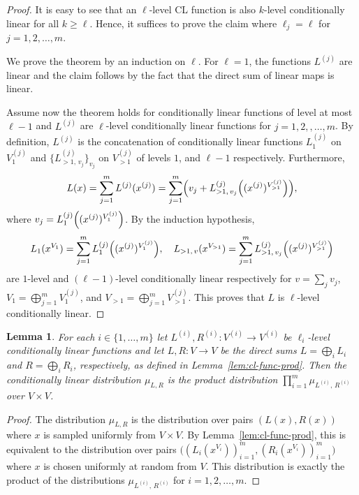 \documentclass[11pt]{article}
\newtheorem{lemma}[theorem]{Lemma}
\theoremstyle{definition}
\begin{document}
\begin{proof}
  It is easy to see that an $\ell$-level CL function is also $k$-level
  conditionally linear for all $k \ge \ell$.
  Hence, it suffices to prove the claim where $\ell_j = \ell$ for $j=1, 2,
  \ldots, m$.

  We prove the theorem by an induction on $\ell$.
  For $\ell = 1$, the functions $L^{(j)}$ are linear and the claim follows by
  the fact that the direct sum of linear maps is linear.

  Assume now the theorem holds for conditionally linear functions of level at
  most $\ell-1$ and $L^{(j)}$ are $\ell$-level conditionally linear functions
  for $j=1, 2, ,\ldots, m$.
  By definition, $L^{(j)}$ is the concatenation of conditionally linear
  functions $L^{(j)}_{1}$ on $V^{(j)}_1$ and $\{ L^{(j)}_{>1,\, v_j} \}_{v_j}$
  on $V^{(j)}_{>1}$ of levels $1$, and $\ell-1$ respectively.
  Furthermore,
  \begin{equation*}
    L(x) = \sum_{j=1}^m L^{(j)} (x^{(j)}) = \sum_{j=1}^m \Bigl( v_j +
    L^{(j)}_{>1,\, v_j}
    \Bigl((x^{(j)})^{V^{(j)}_{>1}} \Bigr) \Bigr),
  \end{equation*}
  where $v_j = L^{(j)}_{1}\Bigl( (x^{(j)})^{V^{(j)}_1}
    \Bigr)$.
  By the induction hypothesis,
  \begin{equation*}
    L_{1} (x^{V_1}) = \sum_{j=1}^m L^{(j)}_{1}\Bigl( (x^{(j)})^{V^{(j)}_1}
    \Bigr),\quad L_{>1,\, v} (x^{V_{>1}}) = \sum_{j=1}^m L^{(j)}_{>1,\, v_j}
    \Bigl((x^{(j)})^{V^{(j)}_{>1}} \Bigr)
  \end{equation*}
  are $1$-level and $(\ell-1)$-level conditionally linear respectively for $v =
  \sum_j v_j$, $V_1 = \bigoplus_{j=1}^m V^{(j)}_1$, and $V_{>1} =
  \bigoplus_{j=1}^m V^{(j)}_{>1}$.
  This proves that $L$ is $\ell$-level conditionally linear.
\end{proof}

\begin{lemma}
  \label{lem:cl-dist-prod}
  For each $i \in \{1,\ldots,m\}$ let $L^{(i)}, R^{(i)} : V^{(i)} \to V^{(i)}$
  be $\ell_i$-level conditionally linear functions and let $L, R: V \to V$ be the
  direct sums $L = \bigoplus_i L_i$ and $R = \bigoplus_i R_i$, respectively, as
  defined in Lemma~\ref{lem:cl-func-prod}.
  Then the conditionally linear distribution $\mu_{L, R}$ is the product
  distribution $\prod_{i=1}^m \mu_{L^{(i)},\, R^{(i)}}$ over $V \times V$.
\end{lemma}

\begin{proof}
	The distribution $\mu_{L,R}$ is the distribution over pairs $(L(x),R(x))$
  where $x$ is sampled uniformly from $V \times V$.
  By Lemma~\ref{lem:cl-func-prod}, this is equivalent to the distribution over
  pairs $\bigl( (L_i(x^{V_i}))_{i=1}^m, (R_i(x^{V_i}))_{i=1}^m \bigr)$ where $x$
  is chosen uniformly at random from $V$.
  This distribution is exactly the product of the distributions $
  \mu_{L^{(i)},\, R^{(i)}}$ for $i = 1, 2, \ldots, m$.
\end{proof}
\end{document}

